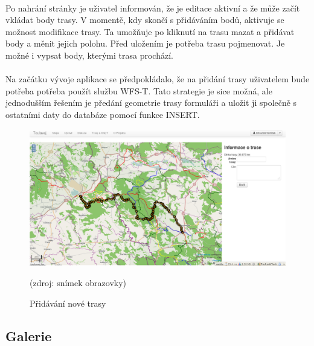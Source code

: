 \documentclass[11pt,a4paper,titlepage,oneside]{book}
\begin{document}
			\paragraph{} Po nahrání stránky je uživatel informován, že je editace aktivní a že může začít vkládat body trasy. V momentě, kdy skončí s přidáváním bodů, aktivuje se možnost modifikace trasy. Ta umožňuje po kliknutí na trasu mazat a přidávat body a měnit jejich polohu. Před uložením je potřeba trasu pojmenovat. Je možné i vypsat body, kterými trasa prochází. 
			\paragraph{} Na začátku vývoje aplikace se předpokládalo, že na přidání trasy uživatelem bude potřeba potřeba použít službu \ac{WFS-T}. Tato strategie je sice možná, ale jednodušším řešením je předání geometrie trasy  formuláři a uložit ji společně s ostatními daty  do databáze pomocí funkce INSERT.
		\begin{figure}[!h]
			\begin{center}
				\includegraphics[width=12cm]{obrazky/toulavej/trackAdd.png}
				\caption{Přidávání nové trasy}
				\label{fig:tAdd}
				(zdroj: snímek obrazovky)
			\end{center}
		\end{figure}

		\subsection{Galerie}
\end{document}
